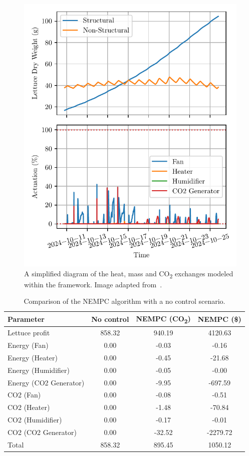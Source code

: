 \documentclass[conference]{IEEEtran}
\begin{document}
\begin{figure}\label{fig:control}
    \centering
    \includegraphics[width=.5\textwidth]{figures/greenhouse_control-mpc-N_5-steps_10801.pdf}
    \caption{A simplified diagram of the heat, mass and CO\textsubscript{2} exchanges modeled within the framework. Image adapted from~\cite{rmward61_2019}.}
\end{figure}

\begin{table}
    \centering
    \caption{Comparison of the NEMPC algorithm with a no control scenario.}\label{tab:comparison}
    \begin{tabular}{lS[table-format=4.2]S[table-format=4.2]S[table-format=4.2]}
        \toprule
        Parameter & {No control} & {NEMPC (CO\textsubscript{2})} & {NEMPC (\$)} \\
        \midrule
        Lettuce profit & 858.32 & 940.19 & 4120.63 \\
        Energy (Fan) & 0.00 & -0.03 & -0.16 \\
        Energy (Heater) & 0.00 & -0.45 & -21.68 \\
        Energy (Humidifier) & 0.00 & -0.05 & -0.00 \\
        Energy (CO2 Generator) & 0.00 & -9.95 & -697.59 \\
        CO2 (Fan) & 0.00 & -0.08 & -0.51 \\
        CO2 (Heater) & 0.00 & -1.48 & -70.84 \\
        CO2 (Humidifier) & 0.00 & -0.17 & -0.01 \\
        CO2 (CO2 Generator) & 0.00 & -32.52 & -2279.72 \\
        \midrule
        Total & 858.32 & 895.45 & 1050.12 \\
        \bottomrule
    \end{tabular}
\end{table}
\end{document}

